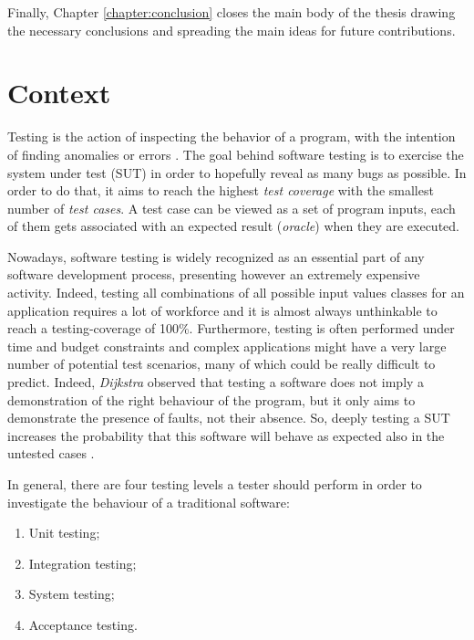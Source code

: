 Finally, Chapter \ref{chapter:conclusion} closes the main body of the thesis drawing the necessary conclusions and spreading the main ideas for future contributions.


\section{Context}
Testing is the action of inspecting the behavior of a program, with the intention of finding anomalies or errors \cite{testing}.
The goal behind software testing is to exercise the system under test (SUT) in order to hopefully reveal as many bugs as possible. In order to do that, it aims to reach the highest \textit{test coverage} with the smallest number of \textit{test cases}. A test case can be viewed as a set of program inputs, each of them gets associated with an expected result (\ie \textit{oracle}) when they are executed. 

Nowadays, software testing is widely recognized as an essential part of any software development process, presenting however an extremely expensive activity. Indeed, testing all combinations of all possible input values classes for an application \cite{glinz} requires a lot of workforce and it is almost always unthinkable to reach a testing-coverage of 100\%. 
Furthermore, testing is often performed under time and budget constraints \cite{grano} and complex applications might have a very large number of potential test scenarios, many of which could be really difficult to predict. Indeed, \textit{Dijkstra} \cite{dijkstra} observed that testing a software does not imply a demonstration of the right behaviour of the program, but it only aims to demonstrate the presence of faults, not their absence. 
So, deeply testing a SUT increases the probability that this software will behave as expected also in the untested cases \cite{glinz}. 

In general, there are four testing levels a tester should perform in order to investigate the behaviour of a traditional software: 
\begin{enumerate}
\item Unit testing; 
\item Integration testing; 
\item System testing; 
\item Acceptance testing.
\end{enumerate}

